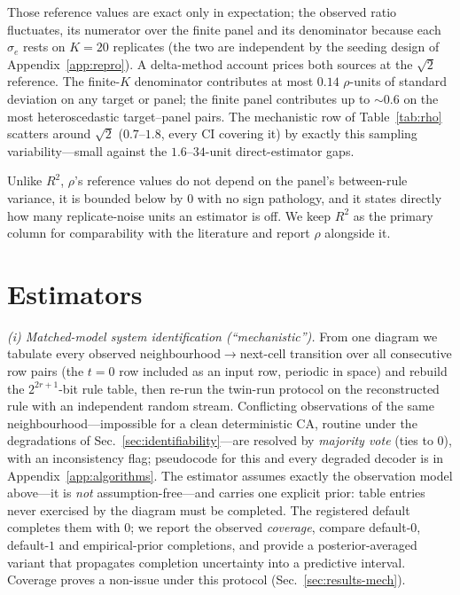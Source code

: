 \documentclass[aip,cha,amsmath,amssymb,reprint,floatfix]{revtex4-2}
\newcommand{\rtwo}{$R^2$}
\begin{document}
Those reference values are exact only in expectation; the observed ratio
fluctuates, its numerator over the finite
panel and its denominator because each $\hat\sigma_e$ rests on $K=20$
replicates (the two are independent by the seeding design of
Appendix~\ref{app:repro}). A delta-method account prices both sources at the
$\sqrt2$ reference. The
finite-$K$ denominator contributes at most $0.14$ $\rho$-units of standard
deviation on any target or panel; the finite panel contributes up to
${\sim}0.6$ on the
most heteroscedastic target--panel pairs. The mechanistic row of
Table~\ref{tab:rho} scatters around $\sqrt2$ ($0.7$--$1.8$, every CI covering
it) by exactly this sampling variability---small against the $1.6$--$34$-unit
direct-estimator gaps.

Unlike \rtwo{}, $\rho$'s reference values do not depend
on the panel's between-rule variance, it is bounded below by $0$ with no sign
pathology, and it states directly how many replicate-noise units an estimator
is off. We keep \rtwo{} as the primary column for comparability with the
literature and report $\rho$ alongside it.

\section{Estimators}
\label{sec:estimators}

\emph{(i) Matched-model system identification (``mechanistic'').} From one
diagram we tabulate every observed neighbourhood$\to$next-cell transition
over all consecutive row pairs (the $t{=}0$ row included as an input row,
periodic in space) and rebuild the $2^{2r+1}$-bit rule table, then re-run the
twin-run protocol on the reconstructed rule with an independent random
stream. Conflicting observations of the same neighbourhood---impossible for
a clean deterministic CA, routine under the degradations of
Sec.~\ref{sec:identifiability}---are resolved by \emph{majority vote} (ties
to $0$), with an inconsistency flag; pseudocode for this and every degraded
decoder is in Appendix~\ref{app:algorithms}. The estimator assumes exactly the
observation model above---it is \emph{not} assumption-free---and carries
one explicit prior: table entries never exercised by the diagram must be
completed. The registered default completes them with $0$; we report the
observed \emph{coverage}, compare default-$0$, default-$1$ and
empirical-prior completions, and provide a posterior-averaged variant that
propagates completion uncertainty into a predictive interval. Coverage proves
a non-issue under this protocol (Sec.~\ref{sec:results-mech}).
\end{document}
